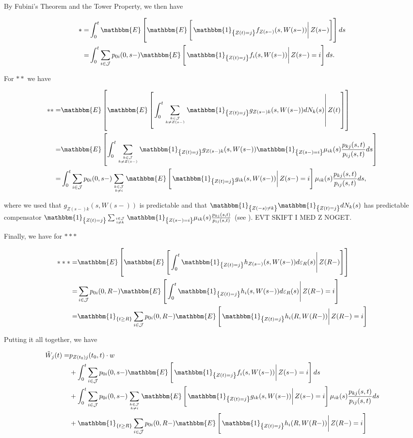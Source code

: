 \documentclass{article}
\newcommand{\1}[1]{\mathbbm{1}_{\left\lbrace #1 \right\rbrace}}
\newcommand{\expec}[1][def]{\mathbbm{E} \left[ #1 \right]}
\newcommand{\econd}[2][def]{\mathbbm{E} \left[ \left. #1 \right| #2 \right]}
\theoremstyle{break}
\theoremstyle{remark}
\numberwithin{equation}{section}
\begin{document}
\begin{appendices}
By Fubini's Theorem and the Tower Property, we then have

\begin{align*}
	* =& \int_0^t \mathbbm{E} \left[ \econd[\1{Z(t)=j} f_{Z(s-)}(s,W(s-))]{Z(s-)} \right] ds \\
	=& \int_0^t \sum_{i \in \mathcal{J}} p_{0i}(0,s-) \econd[\1{Z(t)=j} f_{i}(s,W(s-))]{Z(s-)=i} ds.
\end{align*}

For $**$ we have

\begin{align*}
	** =& \mathbbm{E} \left[ \econd[ \int_0^t \sum_{k \in \mathcal{J} \atop k \neq Z(s-)} \1{Z(t)=j} g_{Z(s-)k}(s,W(s-)) dN_k(s)]{Z(t)} \right] \\
	=& \expec[ \int_0^t \sum_{k \in \mathcal{J} \atop k \neq Z(s-)} \1{Z(t)=j} g_{Z(s-)k}(s,W(s-)) \1{Z(s-)=i} \mu_{ik}(s) \frac{p_{kj}(s,t)}{p_{ij}(s,t)} ds] \\
	=& \int_0^t \sum_{i \in \mathcal{J}} p_{0i}(0,s-) \sum_{k \in \mathcal{J} \atop k \neq i} \econd[\1{Z(t)=j} g_{ik}(s,W(s-))]{Z(s-)=i} \mu_{ik}(s) \frac{p_{kj}(s,t)}{p_{ij}(s,t)} ds,
\end{align*}

where we used that $g_{Z(s-)k}(s,W(s-))$ is predictable and that $\1{Z(-s) \neq k}\1{Z(t)=j}dN_k(s)$ has predictable compensator $\1{Z(t)=j} \sum_{i \in \mathcal{J} \atop i \neq k} \1{Z(s-)=i} \mu_{ik}(s) \frac{p_{kj}(s,t)}{p_{ij}(s,t)}$ (see \cite{Lollike}). EVT SKIFT I MED Z NOGET.

Finally, we have for $***$

\begin{align*}
	*** =& \mathbbm{E} \left[ \econd[\int_0^t \1{Z(t)=j} h_{Z(s-)}(s,W(s-)) d \varepsilon_{R}(s)]{Z(R-)} \right] \\
	=& \sum_{i \in \mathcal{J}} p_{0i}(0,R-) \econd[\int_0^t \1{Z(t)=j} h_{i}(s,W(s-)) d \varepsilon_{R}(s)]{Z(R-)=i} \\
	=& \1{t \geq R} \sum_{i \in \mathcal{J}} p_{0i}(0,R-) \econd[\1{Z(t)=j} h_{i}(R,W(R-))]{Z(R-)=i}
\end{align*}

Putting it all together, we have

\begin{align*}
    \tilde{W}_j(t) =& p_{Z(t_0)j}(t_0,t) \cdot w \\
    &+ \int_0^t \sum_{i \in \mathcal{J}} p_{0i}(0,s-) \econd[\1{Z(t)=j} f_{i}(s,W(s-))]{Z(s-)=i} ds \\
    &+ \int_0^t \sum_{i \in \mathcal{J}} p_{0i}(0,s-) \sum_{k \in \mathcal{J} \atop k \neq i} \econd[\1{Z(t)=j} g_{ik}(s,W(s-))]{Z(s-)=i} \mu_{ik}(s) \frac{p_{kj}(s,t)}{p_{ij}(s,t)} ds \\
    &+ \1{t \geq R} \sum_{i \in \mathcal{J}} p_{0i}(0,R-) \econd[\1{Z(t)=j} h_{i}(R,W(R-))]{Z(R-)=i} \\
\end{align*}


\end{appendices}
\end{document}
